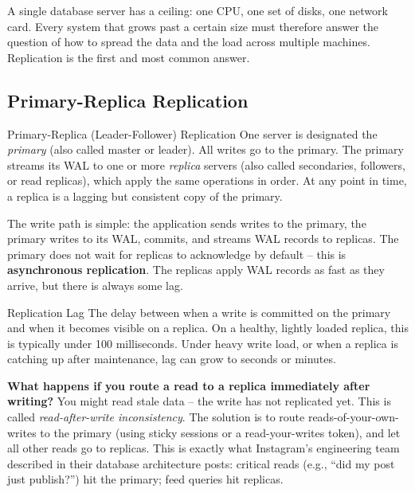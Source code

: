 \documentclass[11pt,a4paper]{article}
\begin{document}
A single database server has a ceiling: one CPU, one set of disks, one network card. Every system that grows past a certain size must therefore answer the question of how to spread the data and the load across multiple machines. Replication is the first and most common answer.

\subsection{Primary-Replica Replication}

\begin{termbox}{Primary-Replica (Leader-Follower) Replication}
One server is designated the \emph{primary} (also called master or leader). All writes go to the primary. The primary streams its WAL to one or more \emph{replica} servers (also called secondaries, followers, or read replicas), which apply the same operations in order. At any point in time, a replica is a lagging but consistent copy of the primary.
\end{termbox}

The write path is simple: the application sends writes to the primary, the primary writes to its WAL, commits, and streams WAL records to replicas. The primary does not wait for replicas to acknowledge by default -- this is \textbf{asynchronous replication}. The replicas apply WAL records as fast as they arrive, but there is always some lag.

\begin{termbox}{Replication Lag}
The delay between when a write is committed on the primary and when it becomes visible on a replica. On a healthy, lightly loaded replica, this is typically under 100 milliseconds. Under heavy write load, or when a replica is catching up after maintenance, lag can grow to seconds or minutes.
\end{termbox}

\begin{thinkbox}
\textbf{What happens if you route a read to a replica immediately after writing?} You might read stale data -- the write has not replicated yet. This is called \emph{read-after-write inconsistency}. The solution is to route reads-of-your-own-writes to the primary (using sticky sessions or a read-your-writes token), and let all other reads go to replicas. This is exactly what Instagram's engineering team described in their database architecture posts: critical reads (e.g., ``did my post just publish?'') hit the primary; feed queries hit replicas.
\end{thinkbox}
\end{document}
